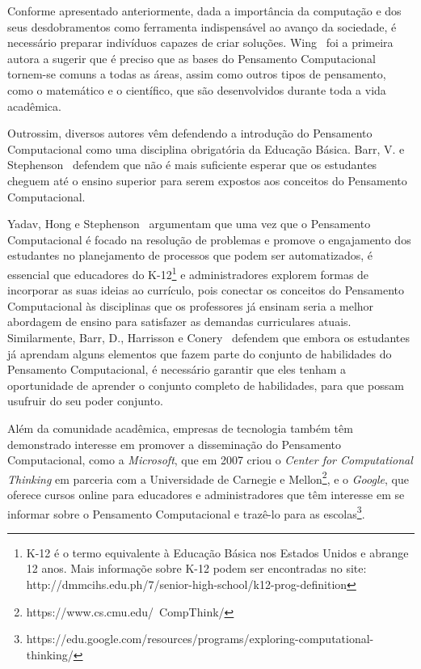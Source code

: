 Conforme apresentado anteriormente, dada a importância da computação e dos seus desdobramentos como ferramenta indispensável ao avanço da sociedade, é necessário preparar indivíduos capazes de criar soluções. Wing~\cite{wing_computational_2006} foi a primeira autora a sugerir que é preciso que as bases do Pensamento Computacional tornem-se comuns a todas as áreas, assim como outros tipos de pensamento, como o matemático e o científico, que são desenvolvidos durante toda a vida acadêmica.

Outrossim, diversos autores vêm defendendo a introdução do Pensamento Computacional como uma disciplina obrigatória da Educação Básica. Barr, V. e Stephenson~\cite{barr_bringing_2011} defendem que não é mais suficiente esperar que os estudantes cheguem até o ensino superior para serem expostos aos conceitos do Pensamento Computacional.  

Yadav, Hong e Stephenson~\cite{yadav_computational_2016} argumentam que uma vez que o Pensamento Computacional é focado na resolução de problemas e promove o engajamento dos estudantes no planejamento de processos que podem ser automatizados, é essencial que educadores do K-12\footnote{K-12 é o termo equivalente à Educação Básica nos Estados Unidos e abrange 12 anos. Mais informaçõe sobre K-12 podem ser encontradas no site: http://dmmcihs.edu.ph/7/senior-high-school/k12-prog-definition} e administradores explorem formas de incorporar as suas ideias ao currículo, pois conectar os conceitos do Pensamento Computacional às disciplinas que os professores já ensinam seria a melhor abordagem de ensino para satisfazer as demandas curriculares atuais. Similarmente, Barr, D., Harrisson e Conery~\cite{barr_computational_2011} defendem que embora os estudantes já aprendam alguns elementos que fazem parte do conjunto de habilidades do Pensamento Computacional, é necessário garantir que eles tenham a oportunidade de aprender o conjunto completo de habilidades, para que possam usufruir do seu poder conjunto.
 
Além da comunidade acadêmica, empresas de tecnologia também têm demonstrado interesse em promover a disseminação do Pensamento Computacional, como a \textit{Microsoft}, que em 2007 criou o \textit{Center for Computational Thinking} em parceria com a Universidade de Carnegie e Mellon\footnote{https://www.cs.cmu.edu/~CompThink/}, e o \textit{Google}, que oferece cursos online para educadores e administradores que têm interesse em se informar sobre o Pensamento Computacional e trazê-lo para as escolas\footnote{https://edu.google.com/resources/programs/exploring-computational-thinking/}.

